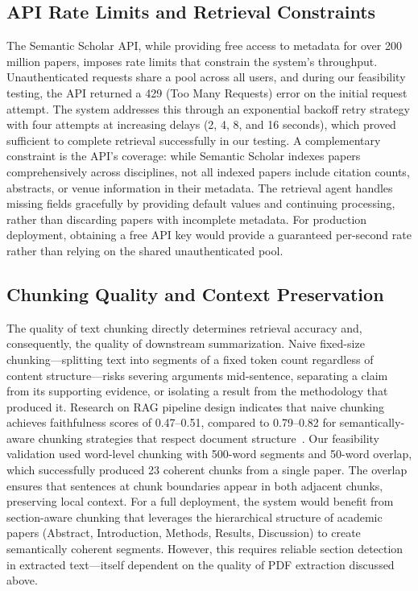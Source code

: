 \documentclass[12pt,a4paper]{article}
\begin{document}
\subsection{API Rate Limits and Retrieval Constraints}

The Semantic Scholar API, while providing free access to metadata for over 200 million papers, imposes rate limits that constrain the system's throughput. Unauthenticated requests share a pool across all users, and during our feasibility testing, the API returned a 429 (Too Many Requests) error on the initial request attempt. The system addresses this through an exponential backoff retry strategy with four attempts at increasing delays (2, 4, 8, and 16 seconds), which proved sufficient to complete retrieval successfully in our testing. A complementary constraint is the API's coverage: while Semantic Scholar indexes papers comprehensively across disciplines, not all indexed papers include citation counts, abstracts, or venue information in their metadata. The retrieval agent handles missing fields gracefully by providing default values and continuing processing, rather than discarding papers with incomplete metadata. For production deployment, obtaining a free API key would provide a guaranteed per-second rate rather than relying on the shared unauthenticated pool.

\subsection{Chunking Quality and Context Preservation}

The quality of text chunking directly determines retrieval accuracy and, consequently, the quality of downstream summarization. Naive fixed-size chunking---splitting text into segments of a fixed token count regardless of content structure---risks severing arguments mid-sentence, separating a claim from its supporting evidence, or isolating a result from the methodology that produced it. Research on RAG pipeline design indicates that naive chunking achieves faithfulness scores of 0.47--0.51, compared to 0.79--0.82 for semantically-aware chunking strategies that respect document structure~\citep{gao2024ragsurvey}. Our feasibility validation used word-level chunking with 500-word segments and 50-word overlap, which successfully produced 23 coherent chunks from a single paper. The overlap ensures that sentences at chunk boundaries appear in both adjacent chunks, preserving local context. For a full deployment, the system would benefit from section-aware chunking that leverages the hierarchical structure of academic papers (Abstract, Introduction, Methods, Results, Discussion) to create semantically coherent segments. However, this requires reliable section detection in extracted text---itself dependent on the quality of PDF extraction discussed above.
\end{document}
